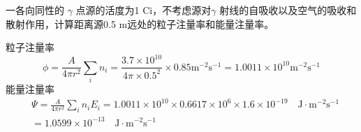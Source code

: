 \begin{problem}[5]
  一各向同性的 $\gamma$ 点源的活度为1 Ci，不考虑源对$\gamma$ 射线的自吸收以及空气的吸收和散射作用，计算距离源0.5 m远处的粒子注量率和能量注量率。
\end{problem}

\begin{solution}
	粒子注量率
	\[\phi = \frac{A}{4\pi r^2} \sum_{i} n_i =\frac{3.7 \times 10^{10}}{4\pi \times 0.5^2} \times 0.85 \text{m}^{-2} \text{s}^{-1}=1.0011 \times 10^{10} \text{m}^{-2} \text{s}^{-1}\]
	能量注量率
	\[\begin{split}
		& \Psi = \frac{A}{4\pi r^2} \sum_{i} n_i E_i = 1.0011 \times 10^{10} \times 0.6617 \times 10^6 \times 1.6 \times 10^{-19} \quad \text{J} \cdot \text{m}^{-2}\text{s}^{-1}\\
		& =1.0599 \times 10^{-13} \quad \text{J}\cdot\text{m}^{-2}\text{s}^{-1}
	\end{split}\]

\end{solution}



